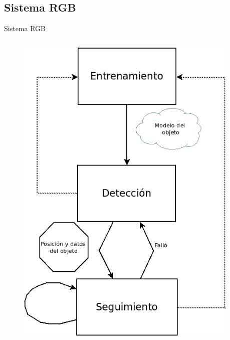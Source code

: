 \documentclass[]{beamer}
\begin{document}
\subsection{Sistema RGB}
\begin{frame}{Sistema RGB}
    \begin{columns}
        \begin{column}{5cm}
            \begin{figure}
                \centering
                \vspace{-15pt}
                \includegraphics[scale=0.3]{img/esquema_seguimiento.png}
            \end{figure}
        \end{column}

        \begin{column}{0.5cm}
        \end{column}


\end{columns}
\end{frame}
\end{document}
